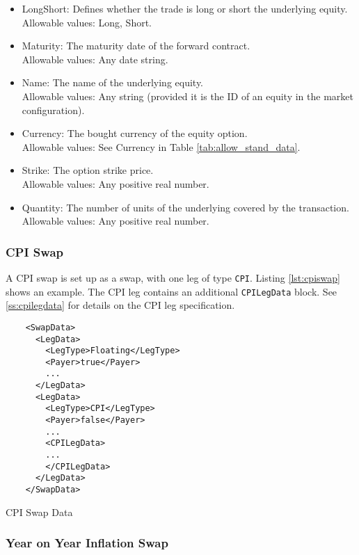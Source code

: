 \begin{itemize}
	\item LongShort: Defines whether the trade is long or short the underlying equity. \\
	Allowable values: Long, Short.
	\item Maturity: The maturity date of the forward contract. \\
	Allowable values: Any date string.
	\item Name: The name of the underlying equity. \\
	Allowable values:  Any string (provided it is the ID of an equity in the market configuration).
	\item Currency: The bought currency of the equity option. \\
	Allowable values:  See Currency in Table \ref{tab:allow_stand_data}.	
	\item Strike: The option strike price. \\
	Allowable values:  Any positive real number.	
	\item Quantity: The number of units of the underlying covered by the transaction. \\
	Allowable values:  Any positive real number.
\end{itemize}

\subsubsection{CPI Swap}

A CPI swap is set up as a swap, with one leg of type {\tt CPI}. Listing \ref{lst:cpiswap} shows an example. The
CPI leg contains an additional {\tt CPILegData} block. See \ref{ss:cpilegdata} for details on the CPI leg specification.

\begin{listing}[H]
\begin{verbatim}
    <SwapData>
      <LegData>
        <LegType>Floating</LegType>
        <Payer>true</Payer>
        ...
      </LegData>
      <LegData>
        <LegType>CPI</LegType>
        <Payer>false</Payer>
        ...
        <CPILegData>
        ...
        </CPILegData>
      </LegData>
    </SwapData>
\end{verbatim}
\caption{CPI Swap Data}
\label{lst:cpiswap}
\end{listing}

\subsubsection{Year on Year Inflation Swap}

